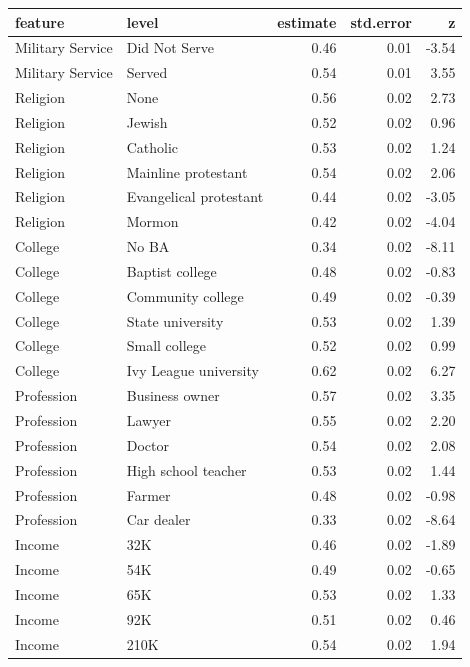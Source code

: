 \documentclass[a4paper,12pt]{article}\usepackage[]{graphicx}\usepackage[]{color}
\begin{document}
\clearpage

\begin{table}[ht]
\centering
\begingroup\footnotesize
\begin{tabular}{lp{3in}rrr}
  \hline
feature & level & estimate & std.error & z \\ 
  \hline
Military Service & Did Not Serve & 0.46 & 0.01 & -3.54 \\ 
  Military Service & Served & 0.54 & 0.01 & 3.55 \\ 
  Religion & None & 0.56 & 0.02 & 2.73 \\ 
  Religion & Jewish & 0.52 & 0.02 & 0.96 \\ 
  Religion & Catholic & 0.53 & 0.02 & 1.24 \\ 
  Religion & Mainline protestant & 0.54 & 0.02 & 2.06 \\ 
  Religion & Evangelical protestant & 0.44 & 0.02 & -3.05 \\ 
  Religion & Mormon & 0.42 & 0.02 & -4.04 \\ 
  College & No BA & 0.34 & 0.02 & -8.11 \\ 
  College & Baptist college & 0.48 & 0.02 & -0.83 \\ 
  College & Community college & 0.49 & 0.02 & -0.39 \\ 
  College & State university & 0.53 & 0.02 & 1.39 \\ 
  College & Small college & 0.52 & 0.02 & 0.99 \\ 
  College & Ivy League university & 0.62 & 0.02 & 6.27 \\ 
  Profession & Business owner & 0.57 & 0.02 & 3.35 \\ 
  Profession & Lawyer & 0.55 & 0.02 & 2.20 \\ 
  Profession & Doctor & 0.54 & 0.02 & 2.08 \\ 
  Profession & High school teacher & 0.53 & 0.02 & 1.44 \\ 
  Profession & Farmer & 0.48 & 0.02 & -0.98 \\ 
  Profession & Car dealer & 0.33 & 0.02 & -8.64 \\ 
  Income & 32K & 0.46 & 0.02 & -1.89 \\ 
  Income & 54K & 0.49 & 0.02 & -0.65 \\ 
  Income & 65K & 0.53 & 0.02 & 1.33 \\ 
  Income & 92K & 0.51 & 0.02 & 0.46 \\ 
  Income & 210K & 0.54 & 0.02 & 1.94 \\ 

\end{tabular}
\end{table}
\end{document}
